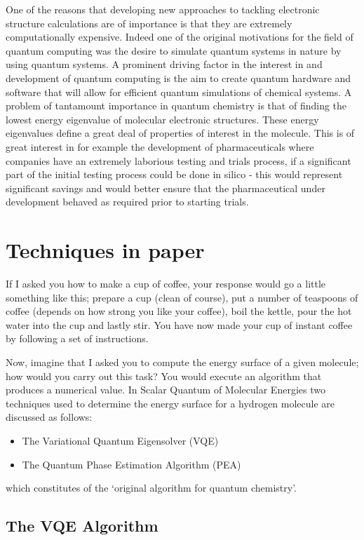\documentclass[12pt]{article}
\begin{document}
One of the reasons that developing new approaches to tackling electronic structure calculations are of importance is that they are extremely
computationally expensive. Indeed one of the original motivations for the field of quantum computing was the desire to simulate quantum systems
 in nature by using quantum systems. A prominent driving factor in the interest in and development of quantum computing is the aim to create quantum
  hardware and software that will allow for efficient quantum simulations of chemical systems. A problem of tantamount importance in quantum chemistry
  is that of finding the lowest energy eigenvalue of molecular electronic structures. These energy eigenvalues define a great deal of properties of
  interest in the molecule. This is of great interest in for example the development of pharmaceuticals where companies have an extremely laborious
  testing and trials process, if a significant part of the initial testing process could be done in silico - this would represent significant savings
  and would better ensure that the pharmaceutical under development behaved as required prior to starting trials.
\section{Techniques in paper}
If I asked you how to make a cup of coffee, your response would go a little something like this; prepare a cup (clean of course), put a number of teaspoons of coffee (depends on how strong you like your coffee), boil the kettle, pour the hot water into the cup and lastly stir. You have now made your cup of instant coffee by following a set of instructions.

Now, imagine that I asked you to compute the energy surface of a given molecule; how would you carry out this task? You would execute an algorithm that produces a numerical value. In Scalar Quantum of Molecular Energies two techniques used to determine the energy surface for a hydrogen molecule are discussed as follows:
\begin{itemize}
\item The Variational Quantum Eigensolver (VQE)
\item The Quantum Phase Estimation Algorithm (PEA)
\end{itemize}
which constitutes of the ‘original algorithm for quantum chemistry’.

\subsection{The VQE Algorithm}
\end{document}
